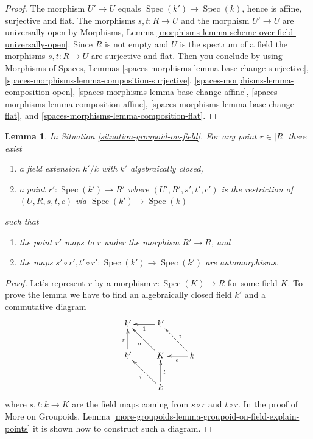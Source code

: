 \documentclass{stacks-project}
\theoremstyle{plain}
\newtheorem{lemma}[subsection]{Lemma}
\theoremstyle{definition}
\theoremstyle{remark}
\numberwithin{equation}{subsection}
\def\Spec{\mathop{\mathrm{Spec}}}
\begin{document}
\begin{proof}
The morphism $U' \to U$ equals $\Spec(k') \to \Spec(k)$,
hence is affine, surjective and flat. The morphisms $s, t : R \to U$
and the morphism $U' \to U$ are universally open by
Morphisms, Lemma \ref{morphisms-lemma-scheme-over-field-universally-open}.
Since $R$ is not empty and $U$ is the spectrum of a field the morphisms
$s, t : R \to U$ are surjective and flat. Then you conclude by using
Morphisms of Spaces, Lemmas
\ref{spaces-morphisms-lemma-base-change-surjective},
\ref{spaces-morphisms-lemma-composition-surjective},
\ref{spaces-morphisms-lemma-composition-open},
\ref{spaces-morphisms-lemma-base-change-affine},
\ref{spaces-morphisms-lemma-composition-affine},
\ref{spaces-morphisms-lemma-base-change-flat}, and
\ref{spaces-morphisms-lemma-composition-flat}.
\end{proof}

\begin{lemma}
\label{lemma-groupoid-on-field-explain-points}
In
Situation \ref{situation-groupoid-on-field}.
For any point $r \in |R|$ there exist
\begin{enumerate}
\item a field extension $k'/k$ with $k'$ algebraically closed,
\item a point $r' : \Spec(k') \to R'$ where
$(U', R', s', t', c')$ is the restriction of $(U, R, s, t, c)$
via $\Spec(k') \to \Spec(k)$
\end{enumerate}
such that
\begin{enumerate}
\item the point $r'$ maps to $r$ under the morphism $R' \to R$, and
\item the maps
$s' \circ r', t' \circ r' : \Spec(k') \to \Spec(k')$
are automorphisms.
\end{enumerate}
\end{lemma}

\begin{proof}
Let's represent $r$ by a morphism $r : \Spec(K) \to R$ for some
field $K$. To prove the lemma we have to find an algebraically closed
field $k'$ and a commutative diagram
$$
\xymatrix{
k' & k' \ar[l]^1 & \\
k' \ar[u]^\tau & K \ar[lu]^\sigma & k \ar[l]^-s \ar[lu]_i \\
& k \ar[lu]^i \ar[u]_t
}
$$
where $s, t : k \to K$ are the field maps coming from
$s \circ r$ and $t \circ r$. In the proof of
More on Groupoids,
Lemma \ref{more-groupoids-lemma-groupoid-on-field-explain-points}
it is shown how to construct such a diagram.
\end{proof}
\end{document}
